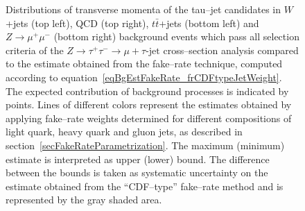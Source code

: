 \begin{figure}[t]
\begin{center}
\begin{picture}
\end{picture}
\caption{\captiontext Distributions of transverse momenta of the tau--jet candidates in
	 $W$+jets (top left), QCD (top right), $t\bar{t}$+jets (bottom left) 
         and $Z \rightarrow \mu^{+} \mu^{-}$ (bottom right) background events which pass all selection criteria 
         of the $Z \rightarrow \tau^{+} \tau^{-} \rightarrow \mu + \tau\mbox{-jet}$ cross--section analysis
	 compared to the estimate obtained from the fake--rate technique, 
         computed according to equation~\ref{eqBgEstFakeRate_frCDFtypeJetWeight}.
	 The expected contribution of background processes is indicated by points.
	 Lines of different colors represent the estimates obtained by applying 
         fake--rate weights determined for different compositions of light quark, heavy quark and gluon jets,
         as described in section~\ref{secFakeRateParametrization}.
	 The maximum (minimum) estimate is interpreted as upper (lower) bound.
	 The difference between the bounds is taken as systematic uncertainty on the estimate 
         obtained from the ``CDF--type'' fake--rate method and is represented by the gray shaded area.}
\label{figBgEstFakeRate_frCDFtypeResults_tauJetPt}
\end{center}
\end{figure} 

